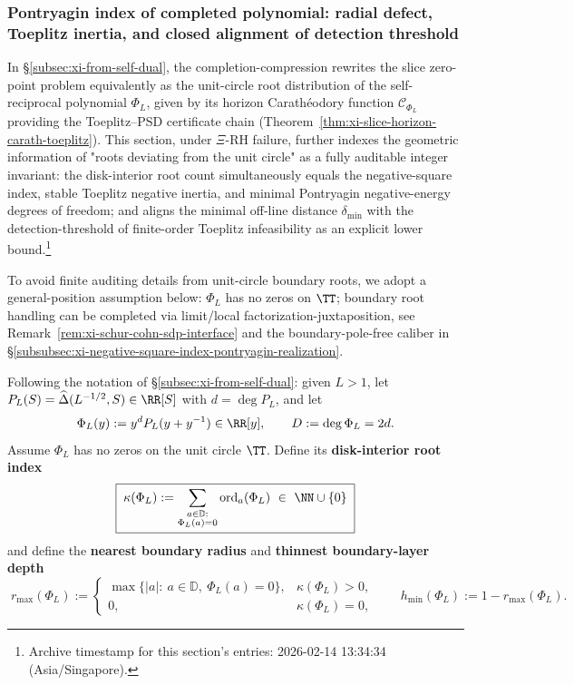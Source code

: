 \subsubsection{Pontryagin index of completed polynomial: radial defect, Toeplitz inertia, and closed alignment of detection threshold}\label{subsubsec:xi-completed-polynomial-pontryagin-index}
In \S\ref{subsec:xi-from-self-dual}, the completion-compression rewrites the slice zero-point problem equivalently as the unit-circle root distribution of the self-reciprocal polynomial \(\Phi_L\), given by its horizon Carathéodory function \(\mathscr{C}_{\Phi_L}\) providing the Toeplitz--PSD certificate chain (Theorem~\ref{thm:xi-slice-horizon-carath-toeplitz}).
This section, under \(\Xi\)-RH failure, further indexes the geometric information of "roots deviating from the unit circle" as a fully auditable integer invariant: the disk-interior root count simultaneously equals the negative-square index, stable Toeplitz negative inertia, and minimal Pontryagin negative-energy degrees of freedom;
and aligns the minimal off-line distance \(\delta_{\min}\) with the detection-threshold of finite-order Toeplitz infeasibility as an explicit lower bound.\footnote{Archive timestamp for this section's entries: 2026-02-14 13:34:34 (Asia/Singapore).}
\par
To avoid finite auditing details from unit-circle boundary roots, we adopt a general-position assumption below: \(\Phi_L\) has no zeros on \(\TT\); boundary root handling can be completed via limit/local factorization-juxtaposition, see Remark~\ref{rem:xi-schur-cohn-sdp-interface} and the boundary-pole-free caliber in \S\ref{subsubsec:xi-negative-square-index-pontryagin-realization}.

\begin{definition}\label{def:xi-phiL-disk-index-depth}
Following the notation of \S\ref{subsec:xi-from-self-dual}: given \(L>1\), let
\(
P_L(S)=\widehat\Delta(L^{-1/2},S)\in\RR[S]
\)
with \(d=\deg P_L\), and let
\[
\Phi_L(y):=y^{d}P_L(y+y^{-1})\in\RR[y],\qquad D:=\deg\Phi_L=2d.
\]
Assume \(\Phi_L\) has no zeros on the unit circle \(\TT\).
Define its \textbf{disk-interior root index}
\[
\boxed{\;
\kappa(\Phi_L):=\sum_{\substack{a\in\mathbb{D}:\\ \Phi_L(a)=0}}\operatorname{ord}_{a}(\Phi_L)\ \in\ \NN\cup\{0\}\;}
\]
and define the \textbf{nearest boundary radius} and \textbf{thinnest boundary-layer depth}
\[
\boxed{\;
r_{\max}(\Phi_L):=
\begin{cases}
\max\{|a|:\ a\in\mathbb{D},\ \Phi_L(a)=0\}, & \kappa(\Phi_L)>0,\\[2pt]
0, & \kappa(\Phi_L)=0,
\end{cases}
\qquad
h_{\min}(\Phi_L):=1-r_{\max}(\Phi_L).\;}
\]
\end{definition}

